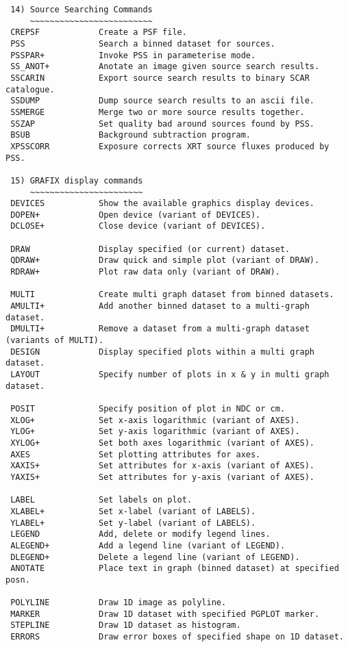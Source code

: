 \begin{verbatim}
 14) Source Searching Commands
     ~~~~~~~~~~~~~~~~~~~~~~~~~
 CREPSF            Create a PSF file.
 PSS               Search a binned dataset for sources.
 PSSPAR+           Invoke PSS in parameterise mode.
 SS_ANOT+          Anotate an image given source search results.
 SSCARIN           Export source search results to binary SCAR catalogue.
 SSDUMP            Dump source search results to an ascii file.
 SSMERGE           Merge two or more source results together.
 SSZAP             Set quality bad around sources found by PSS.
 BSUB              Background subtraction program.
 XPSSCORR          Exposure corrects XRT source fluxes produced by PSS.

 15) GRAFIX display commands
     ~~~~~~~~~~~~~~~~~~~~~~~
 DEVICES           Show the available graphics display devices.
 DOPEN+            Open device (variant of DEVICES).
 DCLOSE+           Close device (variant of DEVICES).

 DRAW              Display specified (or current) dataset.
 QDRAW+            Draw quick and simple plot (variant of DRAW).
 RDRAW+            Plot raw data only (variant of DRAW).

 MULTI             Create multi graph dataset from binned datasets.
 AMULTI+           Add another binned dataset to a multi-graph dataset.
 DMULTI+           Remove a dataset from a multi-graph dataset (variants of MULTI).
 DESIGN            Display specified plots within a multi graph dataset.
 LAYOUT            Specify number of plots in x & y in multi graph dataset.

 POSIT             Specify position of plot in NDC or cm.
 XLOG+             Set x-axis logarithmic (variant of AXES).
 YLOG+             Set y-axis logarithmic (variant of AXES).
 XYLOG+            Set both axes logarithmic (variant of AXES).
 AXES              Set plotting attributes for axes.
 XAXIS+            Set attributes for x-axis (variant of AXES).
 YAXIS+            Set attributes for y-axis (variant of AXES).

 LABEL             Set labels on plot.
 XLABEL+           Set x-label (variant of LABELS).
 YLABEL+           Set y-label (variant of LABELS).
 LEGEND            Add, delete or modify legend lines.
 ALEGEND+          Add a legend line (variant of LEGEND).
 DLEGEND+          Delete a legend line (variant of LEGEND).
 ANOTATE           Place text in graph (binned dataset) at specified posn.

 POLYLINE          Draw 1D image as polyline.
 MARKER            Draw 1D dataset with specified PGPLOT marker.
 STEPLINE          Draw 1D dataset as histogram.
 ERRORS            Draw error boxes of specified shape on 1D dataset.


\end{verbatim}
